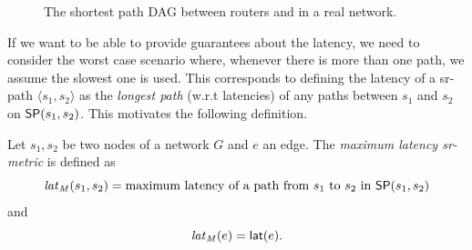 \begin{figure}
\begin{center}
\end{center}
\caption{The shortest path DAG between routers  and  in a real network.}
\label{fig:spdag_ecmp}
\end{figure}

If we want to be able to provide guarantees about the latency, we need to consider the worst case scenario where, whenever
there is more than one path, we assume the slowest one is used. This corresponds to defining the latency of a sr-path
$\langle s_1, s_2 \rangle$ as the \emph{longest path} (w.r.t latencies) of any paths between $s_1$ and $s_2$ on $\sp(s_1, s_2)$.
This motivates the following definition.

\begin{definition}
Let $s_1, s_2$ be two nodes of a network $G$ and $e$ an edge.
The \emph{maximum latency sr-metric} is defined as
$$
\latmax(s_1, s_2) = \textrm{maximum latency of a path from $s_1$ to $s_2$ in $\sp(s_1, s_2)$}
$$
and
$$
\latmax(e) = \lat(e).
$$
\end{definition}

